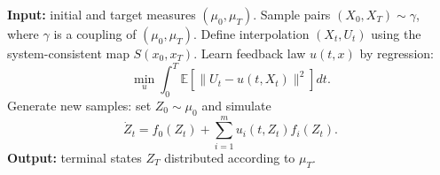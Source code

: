 \documentclass{article}
\begin{document}
\begin{algorithm}
\caption{Flow Matching for Measure Interpolation of Control Systems}
\label{alg:flowmatching}
\begin{algorithmic}[1]
\State \textbf{Input:} initial and target measures $(\mu_0,\mu_T)$.
\State Sample pairs $(X_0,X_T) \sim \gamma$, where $\gamma$ is a coupling of $(\mu_0,\mu_T)$.
\State Define interpolation $(X_t,U_t)$ using the system-consistent map $S(x_0,x_T)$.
\State Learn feedback law $u(t,x)$ by regression:
\[
\min_{u} \int_0^T \mathbb{E}\!\left[ \| U_t - u(t,X_t) \|^2 \right] dt.
\]
\State Generate new samples: set $Z_0 \sim \mu_0$ and simulate
\[
\dot{Z}_t = f_0(Z_t) + \sum_{i=1}^m u_i(t,Z_t) f_i(Z_t).
\]
\State \textbf{Output:} terminal states $Z_T$ distributed according to $\mu_T$.
\end{algorithmic}
\end{algorithm}







\end{document}
